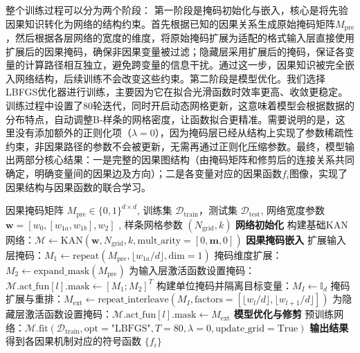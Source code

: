 整个训练过程可以分为两个阶段：
第一阶段是掩码初始化与嵌入，核心是将先验因果知识转化为网络的结构约束。首先根据已知的因果关系生成原始掩码矩阵$M_{\text{pre}}$，然后根据各层网络的宽度的维度，将原始掩码扩展为适配的格式\pozhehao 输入层直接使用扩展后的因果掩码，确保非因果变量被过滤；隐藏层采用扩展后的掩码，保证各变量的计算路径相互独立，避免跨变量的信息干扰。通过这一步，因果知识被完全嵌入网络结构，后续训练不会改变这些约束。第二阶段是模型优化。我们选择LBFGS优化器进行训练，主要因为它在拟合光滑函数时效率更高、收敛更稳定。训练过程中设置了80轮迭代，同时开启动态网格更新，这意味着模型会根据数据的分布特点，自动调整B-样条的网格密度，让函数拟合更精准。需要说明的是，这里没有添加额外的正则化项（$\lambda=0$），因为掩码层已经从结构上实现了参数稀疏性约束，非因果路径的参数不会被更新，无需再通过正则化压缩参数。最终，模型输出两部分核心结果：一是完整的因果图结构（由掩码矩阵和修剪后的连接关系共同确定，明确变量间的因果边及方向）；二是各变量对应的因果函数${f_i}$图像，实现了因果结构与因果函数的联合学习。
\begin{algorithm}[H]
	\caption{基于结构约束的Causal-KAN训练流程}
	\label{alg:causal-kan}
	\begin{algorithmic}[1]
		\REQUIRE 因果掩码矩阵 $M_{\text{pre}} \in \{0,1\}^{d \times d}$, 训练集 $\mathcal{D}_{\text{train}}$，测试集 $\mathcal{D}_{\text{test}}$,  网络宽度参数 $\mathbf{w} = [w_0, [w_{1a}, w_{1b}], w_2]$ , 样条网格参数 $(N_{\text{grid}}, k)$
		\STATE \textbf{网络初始化}
		\STATE 构建基础KAN网络：$\mathcal{M} \leftarrow \text{KAN}(\mathbf{w}, N_{\text{grid}}, k, \text{mult\_arity}=[0, \mathbf{m}, 0])$
		\STATE \textbf{因果掩码嵌入}
		\STATE 扩展输入层掩码：$M_1 \leftarrow \text{repeat}(M_{\text{pre}}, \lfloor w_{1a}/d \rfloor, \text{dim}=1)$
		\STATE 掩码维度扩展：$M_2 \leftarrow \text{expand\_mask}(M_{\text{pre}})$
		\STATE 为输入层激活函数设置掩码：$\mathcal{M}.\text{act\_fun}[l].\text{mask} \leftarrow [M_1; M_2]^T$
		\ELSE
		\STATE 构建单位掩码并隔离目标变量：$M_I \leftarrow \mathbb{I}_d$
		\STATE 掩码扩展与重排：$M_{\text{ext}} \leftarrow \text{repeat\_interleave}(M_I, \text{factors}=[\lfloor w_l/d \rfloor, \lfloor w_{l+1}/d \rfloor])$
		\STATE 为隐藏层激活函数设置掩码：$\mathcal{M}.\text{act\_fun}[l].\text{mask} \leftarrow M_{\text{ext}}$
		\ENDIF
		\ENDFOR
		\STATE \textbf{模型优化与修剪}
		\STATE 预训练网络：$\mathcal{M}.\text{fit}(\mathcal{D}_{\text{train}}, \text{opt}=\text{"LBFGS"}, T=80, \lambda=0, \text{update\_grid}=\text{True})$
		\STATE \textbf{输出结果}
		\STATE 得到各因果机制对应的符号函数 $\{f_i\}$
	\end{algorithmic}
\end{algorithm}

